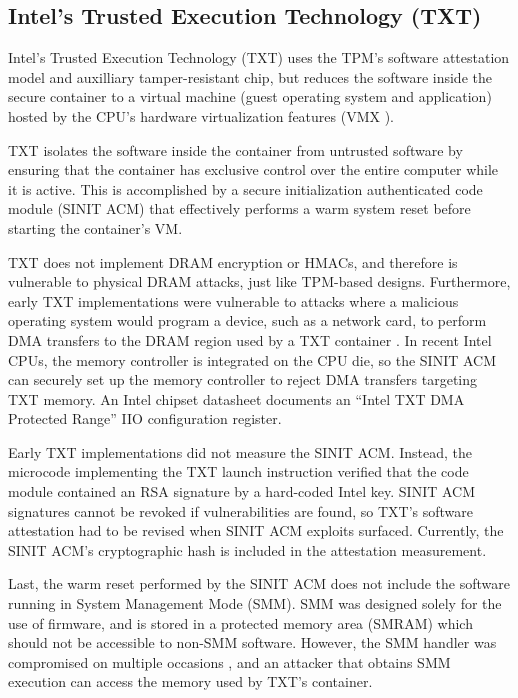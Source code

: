 \subsection{Intel's Trusted Execution Technology (TXT)}
\label{sec:intel_txt}

Intel's Trusted Execution Technology (TXT) \cite{grawrock2009txt} uses the
TPM's software attestation model and auxilliary tamper-resistant chip, but
reduces the software inside the secure container to a virtual machine (guest
operating system and application) hosted by the CPU's hardware virtualization
features (VMX \cite{uhlig2005vmx}).

TXT isolates the software inside the container from untrusted software by
ensuring that the container has exclusive control over the entire computer
while it is active. This is accomplished by a secure initialization
authenticated code module (SINIT ACM) that effectively performs a warm system
reset before starting the container's VM.

TXT does not implement DRAM encryption or HMACs, and therefore is vulnerable to
physical DRAM attacks, just like TPM-based designs. Furthermore, early TXT
implementations were vulnerable to attacks where a malicious operating system
would program a device, such as a network card, to perform DMA transfers
to the DRAM region used by a TXT container \cite{wojtczuk2009txt,
wojtczuk2009txt2}. In recent Intel CPUs, the memory controller is integrated on
the CPU die, so the SINIT ACM
can securely set up the memory controller to reject DMA transfers targeting TXT
memory. An Intel chipset datasheet \cite{intel2015datasheet} documents an
``Intel TXT DMA Protected Range'' IIO configuration register.

Early TXT implementations did not measure the SINIT ACM. Instead, the microcode
implementing the TXT launch instruction verified that the code module contained
an RSA signature by a hard-coded Intel key. SINIT ACM signatures cannot be
revoked if vulnerabilities are found, so TXT's software attestation had to be
revised when SINIT ACM exploits \cite{wojtczuk2011txt} surfaced. Currently, the
SINIT ACM's cryptographic hash is included in the attestation measurement.

Last, the warm reset performed by the SINIT ACM does not include the software
running in System Management Mode (SMM). SMM was designed
solely for the use of firmware, and is stored in a protected memory area
(SMRAM) which should not be accessible to non-SMM software. However, the SMM
handler was compromised on multiple occasions \cite{duflot2006smm,
rutkowska2008remap, wojtczuk2009smm, wecherowski2009smm, embleton2010smm}, and
an attacker that obtains SMM execution can access the memory used by TXT's
container.
